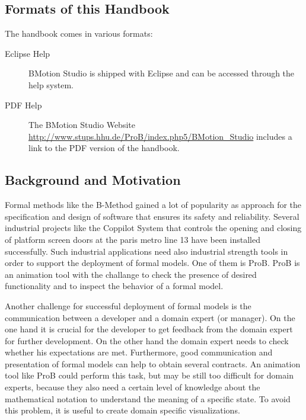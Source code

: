 \documentclass[12pt]{book}
\begin{document}
\subsection{Formats of this Handbook}

The handbook comes in various formats:

\begin{description}
	\item[Eclipse Help] BMotion Studio is shipped with Eclipse and can be accessed through the help system.
	\item[PDF Help] The BMotion Studio Website \url{http://www.stups.hhu.de/ProB/index.php5/BMotion_Studio} includes a link to the PDF version of the handbook.
\end{description}

\subsection{Background and Motivation}

Formal methods like the B-Method gained a lot of popularity as approach for the specification and design of software that ensures its safety and reliability. Several industrial projects like the Coppilot System that controls the opening and closing of platform screen doors at the paris metro line 13 have been installed successfully. Such industrial applications need also industrial strength tools in order to support the deployment of formal models. One of them is ProB. ProB is an animation tool with the challange to check the presence of desired functionality and to inspect the behavior of a formal model.

Another challenge for successful deployment of formal models is the communication between a developer and a domain expert (or manager). On the one hand it is crucial for the developer to get feedback from the domain expert for further development. On the other hand the domain expert needs to check whether his expectations are met. Furthermore, good communication and presentation of formal models can help to obtain several contracts. An animation tool like ProB could perform this task, but may be still too difficult for domain experts, because they also need a certain level of knowledge about the mathematical notation to understand the meaning of a specific state. To avoid this problem, it is useful to create domain specific visualizations.
\end{document}
